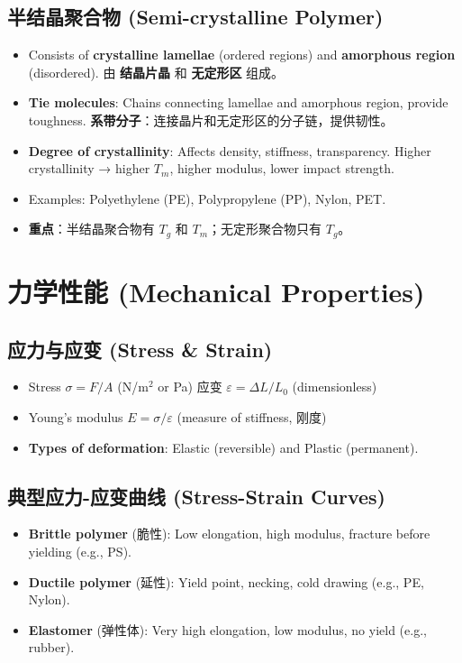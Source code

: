 \documentclass[12pt,a4paper]{ctexart}
\begin{document}
\subsection{半结晶聚合物 (Semi-crystalline Polymer)}
\begin{itemize}
    \item Consists of \textbf{crystalline lamellae} (ordered regions) and \textbf{amorphous region} (disordered).  
    由 \textbf{结晶片晶} 和 \textbf{无定形区} 组成。
    \item \textbf{Tie molecules}: Chains connecting lamellae and amorphous region, provide toughness.  
    \textbf{系带分子}：连接晶片和无定形区的分子链，提供韧性。
    \item \textbf{Degree of crystallinity}: Affects density, stiffness, transparency. Higher crystallinity → higher $T_m$, higher modulus, lower impact strength.
    \item Examples: Polyethylene (PE), Polypropylene (PP), Nylon, PET.
    \item \textbf{重点}：半结晶聚合物有 $T_g$ 和 $T_m$；无定形聚合物只有 $T_g$。
\end{itemize}

\section{力学性能 (Mechanical Properties)}

\subsection{应力与应变 (Stress \& Strain)}
\begin{itemize}
    \item Stress $\sigma = F/A$ (N/m$^2$ or Pa)  
      应变 $\varepsilon = \Delta L / L_0$ (dimensionless)
    \item Young's modulus $E = \sigma / \varepsilon$ (measure of stiffness, 刚度)
    \item \textbf{Types of deformation}: Elastic (reversible) and Plastic (permanent).
\end{itemize}

\subsection{典型应力-应变曲线 (Stress-Strain Curves)}
\begin{itemize}
    \item \textbf{Brittle polymer} (脆性): Low elongation, high modulus, fracture before yielding (e.g., PS).
    \item \textbf{Ductile polymer} (延性): Yield point, necking, cold drawing (e.g., PE, Nylon).
    \item \textbf{Elastomer} (弹性体): Very high elongation, low modulus, no yield (e.g., rubber).
\end{itemize}
\end{document}
